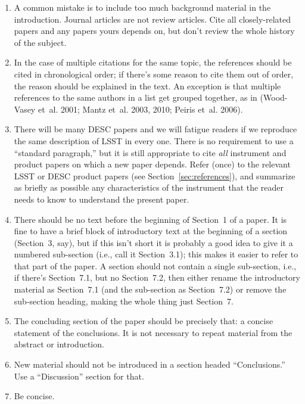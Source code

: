 \documentclass[letterpaper,11pt]{article}
\begin{document}
\begin{enumerate}

\item A common mistake is to include too much background material in the
introduction.  Journal articles are not review articles. Cite all
closely-related papers and any papers yours depends on, but don't review the
whole history of the subject.

\item In the case of multiple citations for the same topic, the references should be cited in chronological order; if there's some reason to cite them out of order, the reason should be explained in the text.
An exception is that multiple references to the same authors in a list get grouped together, as in (Wood-Vasey et~al. 2001; Mantz et~al. 2003, 2010; Peiris et~al. 2006).

\item There will be many DESC papers and we will fatigue readers if we
reproduce the same description of LSST in every one.
 There is no requirement to use a ``standard paragraph,''
but it is still appropriate to cite {\it all\/} instrument and product papers
on which a new paper depends.
Refer (once)
to the relevant LSST or DESC product papers (see Section~\ref{sec:references}), and summarize as briefly as
possible any characteristics of the instrument that the reader needs to know
to understand the present paper.

\item
There should be no text before the beginning of Section~1 of a paper.
It is fine to have a brief block of introductory text at the beginning of a
section (Section~3, say), but if this isn't short it is probably a good idea to
give it a numbered sub-section (i.e., call it Section~3.1); this makes it
easier to refer to that part of the paper.  A section should not contain a
single sub-section, i.e., if there's Section~7.1, but no Section~7.2, then
either rename the introductory material as Section~7.1 (and the sub-section
as Section~7.2) or remove the sub-section heading, making the whole thing
just Section~7.


\item The concluding section of the paper should be precisely that: a concise
statement of the conclusions.  It is not necessary to repeat material from the
abstract or introduction.

\item New material should not be introduced in a section headed
``Conclusions.''  Use a ``Discussion'' section for that.

\item Be concise.

\end{enumerate}
\end{document}

